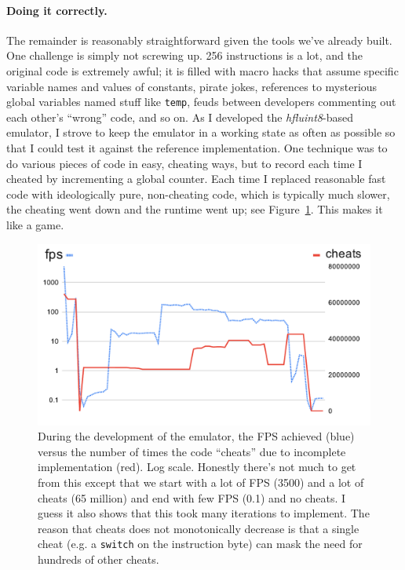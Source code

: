 \documentclass[twocolumn]{article}
\begin{document}
\paragraph{Doing it correctly.}
The remainder is reasonably straightforward given the tools we've already
built. One challenge is simply not screwing up. 256 instructions is a lot,
and the original code is extremely awful; it is filled with macro hacks
that assume specific variable names and values of constants, pirate jokes,
references to mysterious global variables named stuff like {\tt temp},
feuds between developers commenting out each other's ``wrong'' code, and so on.
As I developed the {\it hfluint8}-based emulator, I strove to keep the
emulator in a working state as often as possible so that I could test it
against the reference implementation. One technique was to do various
pieces of code in easy, cheating ways, but to record each time I cheated
by incrementing a global counter. Each time I replaced reasonable fast
code with ideologically pure, non-cheating code, which is typically much slower,
the cheating went down and the runtime went up; see Figure~\ref{fig:cheating}.
This makes it like a game.

\begin{figure}[tp]
  \begin{center}
    \includegraphics[width=0.95 \linewidth]{fpscheats}
  \end{center}
  \caption{
    During the development of the emulator, the FPS achieved (blue) versus
    the number of times the code ``cheats'' due to incomplete implementation (red).
    Log scale. Honestly there's not much to get from this except that we start
    with a lot of FPS (3500) and a lot of cheats (65 million) and end with
    few FPS (0.1) and no cheats. I guess it also shows that this took many
    iterations to implement. The reason that cheats does not monotonically
    decrease is that a single cheat (e.g. a {\tt switch} on the instruction byte)
    can mask the need for hundreds of other cheats.
  } \label{fig:cheating}
\end{figure}
\end{document}
